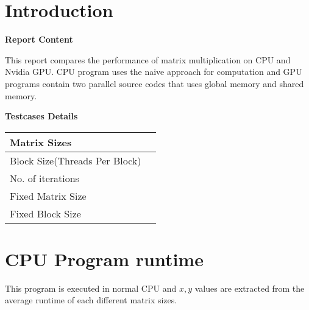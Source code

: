 \documentclass[12pt, a4paper]{article}
\title{\titlefont{Matrix Multiplication Runtime}}
\author{M.A.S SURANGA (CST140043)}
\date{}
\begin{document}
	\maketitle

	\vspace*{5\baselineskip} 
	\begin{center}
	\end{center}

	\newpage
	\setlength{\cftbeforesecskip}{6pt}
	\tableofcontents

	\newpage
	\section{Introduction}
	\hfill \break

	\textbf{Report Content}

	\hfill \break

	This report compares the performance of matrix multiplication on CPU and Nvidia GPU. CPU program uses the naive approach for computation and GPU programs contain two parallel source codes that uses global memory and shared memory.  

	\hfill \break

	\textbf{Testcases Details}

	\hfill \break


	\begin{tabu} to 1 \textwidth { | X[l] | X[r] | }
		 \hline
		 Matrix Sizes &   \\
		 \hline
		 Block Size(Threads Per Block) &   \\
		 \hline
		 No. of iterations &   \\
		 \hline
		 Fixed Matrix Size &   \\
		 \hline
		 Fixed Block Size &   \\ 
		 \hline
	\end{tabu}	
	

	\newpage

	\section{CPU Program runtime}

	\par
	This program is executed in normal CPU and $x,y$ values are extracted from the average runtime of each different matrix sizes.
	\hfill \break
\end{document}

